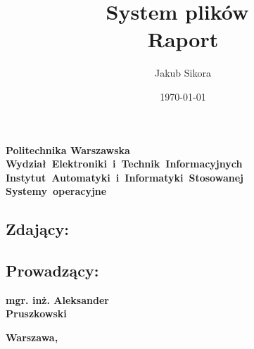 \documentclass{mwrep}
\title{\bf System plików \\ Raport \vskip 0.1cm}
\author{Jakub Sikora}
\date{\today}
\begin{document}
\makeatletter
\renewcommand{\maketitle}{\begin{titlepage}
		\begin{center}{
				\LARGE {\bf Politechnika Warszawska}}\\
            \vspace{0.4cm}
            \leftskip-0.9cm
            {\LARGE {\bf \mbox{Wydział Elektroniki i Technik Informacyjnych}}}\\
            \vspace{0.2cm}
            {\LARGE {\bf \mbox{Instytut Automatyki i Informatyki Stosowanej}}}\\
            
            \vspace{5cm}
            \leftskip1.9cm
			{\bf \Huge \mbox{Systemy operacyjne} \vskip 0.1cm}
		\end{center}
		\vspace{0.1cm}

		\begin{center}
			{\bf \LARGE \@title}
		\end{center}

		\vspace{10cm}
		\begin{paracol}{2}
			\addtocontents{toc}{\protect\setcounter{tocdepth}{1}}
			\subsection*{Zdający:}
			\bf{ \Large{ \noindent\@author \par}}
			\addtocontents{toc}{\protect\setcounter{tocdepth}{2}}

			\switchcolumn \addtocontents{toc}{\protect\setcounter{tocdepth}{1}}
			\subsection*{Prowadzący:}
			\bf{\Large{\noindent mgr. inż. Aleksander \\ Pruszkowski}}
			\addtocontents{toc}{\protect\setcounter{tocdepth}{2}}

		\end{paracol}
		\vspace*{\stretch{6}}
		\begin{center}
			\bf{\large{Warszawa, \@date\vskip 0.1cm}}
		\end{center}
	\end{titlepage}
}
\makeatother
\maketitle
\end{document}
